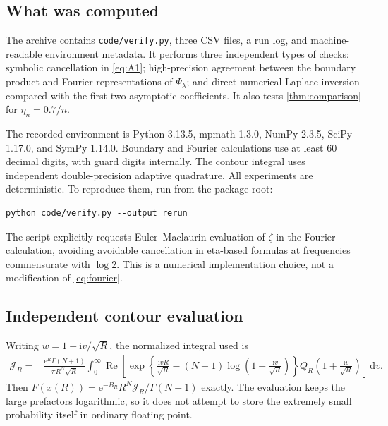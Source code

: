\documentclass[11pt,a4paper]{article}
\numberwithin{equation}{section}
\theoremstyle{definition}
\newcommand{\dd}{\,\mathrm d}
\newcommand{\ii}{\mathrm i}
\newcommand{\ee}{\mathrm e}
\begin{document}
\subsection{What was computed}
The archive contains \texttt{code/verify.py}, three CSV files, a run log, and machine-readable environment metadata. It performs three independent types of checks: symbolic cancellation in \eqref{eq:A1}; high-precision agreement between the boundary product and Fourier representations of $\Psi_\lambda$; and direct numerical Laplace inversion compared with the first two asymptotic coefficients. It also tests \cref{thm:comparison} for $\eta_n=0.7/n$.

The recorded environment is Python 3.13.5, mpmath 1.3.0, NumPy 2.3.5, SciPy 1.17.0, and SymPy 1.14.0. Boundary and Fourier calculations use at least 60 decimal digits, with guard digits internally. The contour integral uses independent double-precision adaptive quadrature. All experiments are deterministic. To reproduce them, run from the package root:
\begin{verbatim}
python code/verify.py --output rerun
\end{verbatim}

The script explicitly requests Euler--Maclaurin evaluation of $\zeta$ in the Fourier calculation, avoiding avoidable cancellation in eta-based formulas at frequencies commensurate with $\log2$. This is a numerical implementation choice, not a modification of \eqref{eq:fourier}.

\subsection{Independent contour evaluation}
Writing $w=1+\ii v/\sqrt R$, the normalized integral used is
\begin{equation}
\begin{split}
 \mathcal J_R={}&\frac{\ee^R\Gamma(N+1)}{\pi R^N\sqrt R}
 \int_0^\infty\operatorname{Re}\left[
 \exp\left\{\frac{\ii vR}{\sqrt R}
 -(N+1)\log\left(1+\frac{\ii v}{\sqrt R}\right)\right\}
 Q_R\left(1+\frac{\ii v}{\sqrt R}\right)\right]\dd v.
\end{split}
\label{eq:numeric-integral}
\end{equation}
Then $F(x(R))=\ee^{-B_R}R^N\mathcal J_R/\Gamma(N+1)$ exactly. The evaluation keeps the large prefactors logarithmic, so it does not attempt to store the extremely small probability itself in ordinary floating point.
\end{document}
